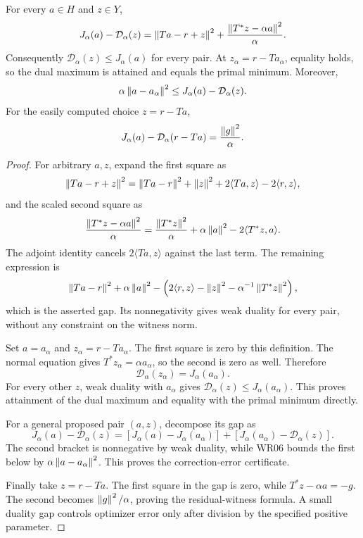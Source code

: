 \begin{theorem}\label{WR14}
For every $a\in H$ and $z\in Y$,
\begin{equation}\label{eq:regularized-duality-gap}
 J_\alpha(a)-\mathcal D_\alpha(z)
 =\left\lVert Ta-r+z\right\rVert^2+
   \frac{\left\lVert T^*z-\alpha a\right\rVert^2}{\alpha}.
\end{equation}
Consequently $\mathcal D_\alpha(z)\le J_\alpha(a)$ for every pair. At
$z_\alpha=r-Ta_\alpha$, equality holds, so the dual maximum is attained and equals the primal minimum. Moreover,
\[
 \alpha\left\lVert a-a_\alpha\right\rVert^2
 \le J_\alpha(a)-\mathcal D_\alpha(z).
\]
For the easily computed choice $z=r-Ta$,
\begin{equation}\label{eq:residual-dual-gap}
 J_\alpha(a)-\mathcal D_\alpha(r-Ta)=\frac{\left\lVert g\right\rVert^2}{\alpha}.
\end{equation}
\end{theorem}
\begin{proof}
For arbitrary $a,z$, expand the first square as
\[
 \left\lVert Ta-r+z\right\rVert^2
 =\left\lVert Ta-r\right\rVert^2+\left\lVert z\right\rVert^2+2\langle Ta,z\rangle-2\langle r,z\rangle,
\]
and the scaled second square as
\[
 \frac{\left\lVert T^*z-\alpha a\right\rVert^2}{\alpha}
 =\frac{\left\lVert T^*z\right\rVert^2}{\alpha}+\alpha\left\lVert a\right\rVert^2
       -2\langle T^*z,a\rangle.
\]
The adjoint identity cancels $2\langle Ta,z\rangle$ against the last term. The remaining expression is
\[
 \left\lVert Ta-r\right\rVert^2+\alpha\left\lVert a\right\rVert^2
 -\left(2\langle r,z\rangle-\left\lVert z\right\rVert^2
                    -\alpha^{-1}\left\lVert T^*z\right\rVert^2\right),
\]
which is the asserted gap. Its nonnegativity gives weak duality for every pair, without any constraint on the witness norm.

Set $a=a_\alpha$ and $z_\alpha=r-Ta_\alpha$. The first square is zero by this definition. The normal equation gives $T^*z_\alpha=\alpha a_\alpha$, so the second is zero as well. Therefore
\[
 \mathcal D_\alpha(z_\alpha)=J_\alpha(a_\alpha).
\]
For every other $z$, weak duality with $a_\alpha$ gives $\mathcal D_\alpha(z)\le J_\alpha(a_\alpha)$. This proves attainment of the dual maximum and equality with the primal minimum directly.

For a general proposed pair $(a,z)$, decompose its gap as
\[
 J_\alpha(a)-\mathcal D_\alpha(z)
 =[J_\alpha(a)-J_\alpha(a_\alpha)]
  +[J_\alpha(a_\alpha)-\mathcal D_\alpha(z)].
\]
The second bracket is nonnegative by weak duality, while WR06 bounds the first below by $\alpha\left\lVert a-a_\alpha\right\rVert^2$. This proves the correction-error certificate.

Finally take $z=r-Ta$. The first square in the gap is zero, while $T^*z-\alpha a=-g$. The second becomes $\left\lVert g\right\rVert^2/\alpha$, proving the residual-witness formula. A small duality gap controls optimizer error only after division by the specified positive parameter.
\end{proof}

